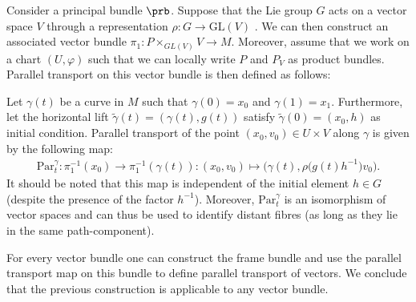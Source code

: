     \begin{example}
        Consider a principal bundle $\prb$. Suppose that the Lie group $G$ acts on a vector space $V$ through a representation $\rho:G\rightarrow\text{GL}(V)$ . We can then construct an associated vector bundle $\pi_1:P\times_{GL(V)} V\rightarrow M$. Moreover, assume that we work on a chart $(U, \varphi)$ such that we can locally write $P$ and $P_V$ as product bundles. Parallel transport on this vector bundle is then defined as follows:

        \qquad Let $\gamma(t)$ be a curve in $M$ such that $\gamma(0)=x_0$ and $\gamma(1) = x_1$. Furthermore, let the horizontal lift $\widetilde{\gamma}(t) = (\gamma(t), g(t))$ satisfy $\widetilde{\gamma}(0)=(x_0, h)$ as initial condition. Parallel transport of the point $(x_0, v_0)\in U\times V$ along $\gamma$ is given by the following map:
        \begin{gather}
            \text{Par}^\gamma_t:\pi^{-1}_1(x_0)\rightarrow\pi^{-1}_1(\gamma(t)):(x_0, v_0)\mapsto \big(\gamma(t), \rho\big(g(t)h^{-1}\big)v_0\big).
        \end{gather}
        It should be noted that this map is independent of the initial element $h\in G$ (despite the presence of the factor $h^{-1}$). Moreover, $\text{Par}^\gamma_t$ is an isomorphism of vector spaces and can thus be used to identify distant fibres (as long as they lie in the same path-component).
    \end{example}
    \begin{remark}
        For every vector bundle one can construct the frame bundle and use the parallel transport map on this bundle to define parallel transport of vectors. We conclude that the previous construction is applicable to any vector bundle.
    \end{remark}



